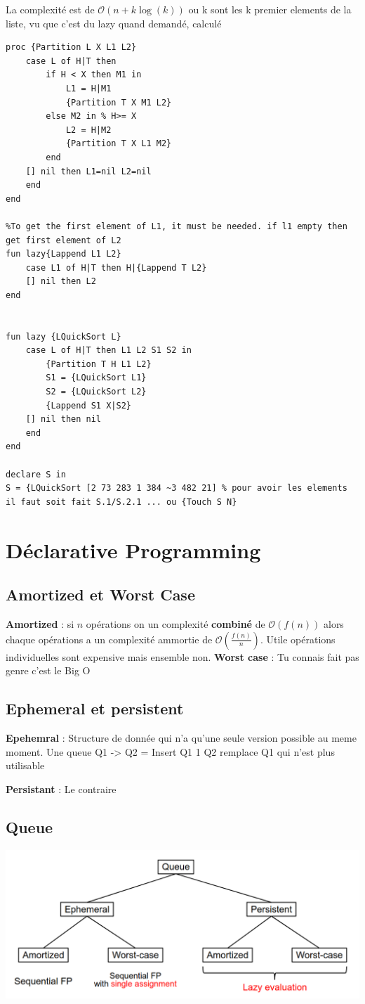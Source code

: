 \documentclass[a4paper,12pt]{scrartcl}
\begin{document}
	La complexité est de $\mathcal{O}(n + k\log (k))$ ou k sont les k premier elements de la liste, vu que c'est du lazy quand demandé, calculé
		\begin{lstlisting}[language=OZ]
%Divide L in sublist L1 L2
proc {Partition L X L1 L2}
	case L of H|T then
		if H < X then M1 in
			L1 = H|M1
			{Partition T X M1 L2}
		else M2 in % H>= X
			L2 = H|M2
			{Partition T X L1 M2}
		end
	[] nil then L1=nil L2=nil
	end
end

%To get the first element of L1, it must be needed. if l1 empty then get first element of L2
fun lazy{Lappend L1 L2}
	case L1 of H|T then H|{Lappend T L2}
	[] nil then L2
end


fun lazy {LQuickSort L}
	case L of H|T then L1 L2 S1 S2 in
		{Partition T H L1 L2}
		S1 = {LQuickSort L1}
		S2 = {LQuickSort L2}
		{Lappend S1 X|S2}
	[] nil then nil
	end
end

declare S in
S = {LQuickSort [2 73 283 1 384 ~3 482 21] % pour avoir les elements il faut soit fait S.1/S.2.1 ... ou {Touch S N}
		\end{lstlisting}
		
\section{Déclarative Programming}
	\subsection{Amortized et Worst Case}
		\textbf{Amortized} : si $n$ opérations on un complexité \textbf{combiné} de $\mathcal{O}(f(n))$ alors chaque opérations a un complexité ammortie de $\mathcal{O}(\frac{f(n)}{n})$. Utile opérations individuelles sont expensive mais ensemble non.
		\textbf{Worst case} : Tu connais fait pas genre c'est le Big O
	\subsection{Ephemeral et persistent}
		\textbf{Epehemral} : Structure de donnée qui n'a qu'une seule version possible au meme moment. Une queue Q1 -> Q2 = {Insert Q1 1} Q2 remplace Q1 qui n'est plus utilisable
		
		\textbf{Persistant} : Le contraire 
	\subsection{Queue}
		\includegraphics[scale=0.5]{img/Queue.png}
		
\end{document}
